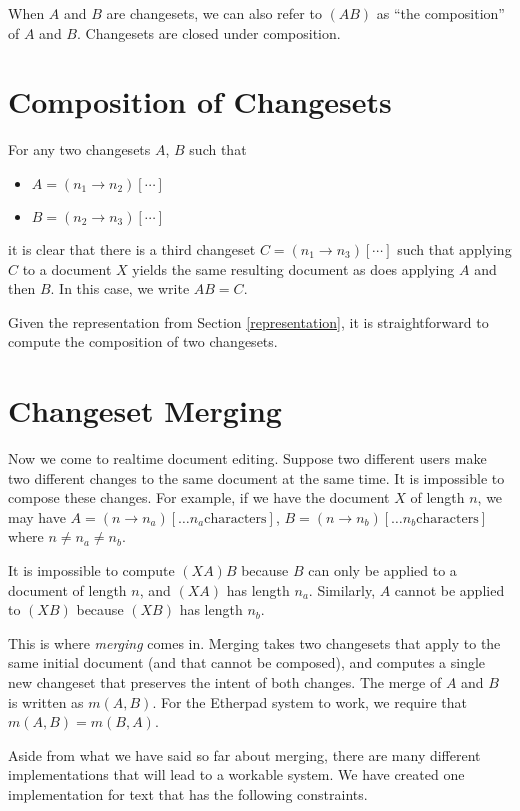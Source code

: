 \documentclass{article}
\begin{document}
When $A$ and $B$ are changesets, we can also refer to $(AB)$ as ``the composition'' of $A$ and $B$.  Changesets are closed under composition.

\section{Composition of Changesets}

For any two changesets $A$, $B$ such that

\begin{itemize}
\item[] $A=(n_1\rightarrow n_2)[\cdots]$
\item[] $B=(n_2\rightarrow n_3)[\cdots]$
\end{itemize}
it is clear that there is a third changeset $C=(n_1\rightarrow n_3)[\cdots]$ such that applying $C$ to a document $X$ yields the same resulting document as does applying $A$ and then $B$.  In this case, we write $AB=C$.

Given the representation from Section \ref{representation}, it is straightforward to compute the composition of two changesets.

\section{Changeset Merging}

Now we come to realtime document editing.  Suppose two different users make two different changes to the same document at the same time.  It is impossible to compose these changes.    For example, if we have the document $X$ of length $n$, we may have $A=(n\rightarrow n_a)[\ldots n_a \mathrm{characters}]$,  $B=(n\rightarrow n_b)[\ldots n_b \mathrm{characters}]$ where $n\neq n_a\neq n_b$.

It is impossible to compute $(XA)B$ because $B$ can only be applied to a document of length $n$, and $(XA)$ has length $n_a$.  Similarly, $A$ cannot be applied to $(XB)$ because $(XB)$ has length $n_b$.

This is where \emph{merging} comes in.  Merging takes two changesets that apply to the same initial document (and that cannot be composed), and computes a single new changeset that preserves the intent of both changes.  The merge of $A$ and $B$ is written as $m(A,B)$.  For the Etherpad system to work, we require that $m(A,B)=m(B,A)$.

Aside from what we have said so far about merging, there are many different implementations that will lead to a workable system.  We have created one implementation for text that has the following constraints.
\end{document}
